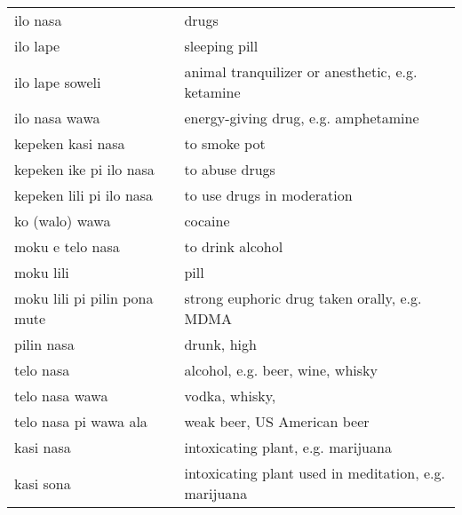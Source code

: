 \begin{supertabular}{p{4,5cm}|ll}
    ilo nasa                                         &  & drugs                                                 \\
    ilo lape                                         &  & sleeping pill                                         \\
    ilo lape soweli                                  &  & animal tranquilizer or anesthetic, e.g. ketamine      \\
    ilo nasa wawa                                    &  & energy-giving drug, e.g. amphetamine                  \\
    kepeken kasi nasa                                &  & to smoke pot                                          \\
    kepeken ike pi ilo nasa                          &  & to abuse drugs                                        \\
    kepeken lili pi ilo nasa                         &  & to use drugs in moderation                            \\
    ko (walo) wawa                                   &  & cocaine                                               \\
    moku e telo nasa                                 &  & to drink alcohol                                      \\
    moku lili                                        &  & pill                                                  \\
    moku lili pi pilin pona mute                     &  & strong euphoric drug taken orally, e.g. MDMA          \\
    pilin nasa                                       &  & drunk, high                                           \\
    telo nasa                                        &  & alcohol, e.g. beer, wine, whisky                      \\
    telo nasa wawa                                   &  & vodka, whisky,                                        \\
    telo nasa pi wawa ala                            &  & weak beer, US American beer                           \\
    kasi nasa                                        &  & intoxicating plant, e.g. marijuana                    \\
    kasi sona                                        &  & intoxicating plant used in meditation, e.g. marijuana \\

\end{supertabular}
